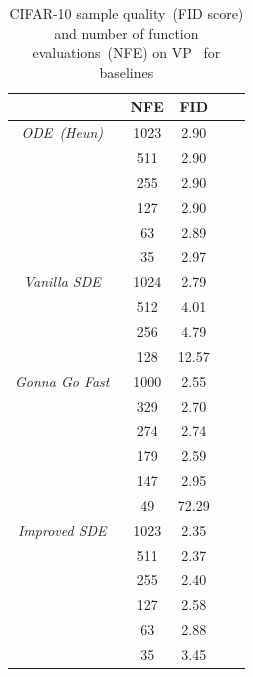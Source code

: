  
\begin{table}[H]
    \centering
    \caption{CIFAR-10 sample quality~(FID score) and number of function evaluations~(NFE) on VP~\cite{Song2020ScoreBasedGM} for baselines}
    \begin{tabular}{c c c c c}
    \toprule
         & NFE & FID \\
          \midrule
\textit{ODE~(Heun)}~\cite{Karras2022ElucidatingTD} 
& 1023 & 2.90 &  \\
& 511 & 2.90\\
& 255 & 2.90\\
& 127 & 2.90 \\
& 63 & 2.89\\
& 35& 2.97 \\
\midrule
          \textit{Vanilla SDE}~\cite{Song2020ScoreBasedGM} & 1024& 2.79 \\
          & 512& 4.01 \\
          & 256 & 4.79\\
          & 128 & 12.57\\
          \midrule
          \textit{Gonna Go Fast}~\cite{JolicoeurMartineau2021GottaGF} 
          & 1000& 2.55 \\
          & 329 & 2.70\\
          & 274 & 2.74\\
          & 179 & 2.59\\
          & 147 & 2.95\\
          & 49 & 72.29\\
          \midrule
        \textit{Improved SDE}~\cite{Karras2022ElucidatingTD} & 1023&  2.35\\
          & 511& 2.37\\
          & 255&  2.40\\
        & 127& 2.58 \\
        & 63& 2.88\\
        & 35 & 3.45\\
        \bottomrule
    \end{tabular}
    \label{tab:app-cifar}
\end{table}

